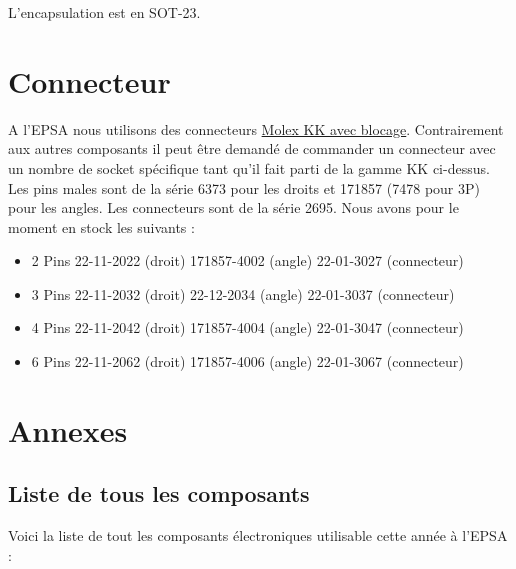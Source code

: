 \documentclass{EPSA-rap-template}
\begin{document}
L'encapsulation est en SOT-23.

\section{Connecteur}

A l'EPSA nous utilisons des connecteurs \href{https://www.mouser.fr/c/connectors/headers-wire-housings/?contact\%20gender=Pin\%20\%28Male\%29&contact\%20plating=Gold&m=Molex&mating\%20post\%20length=7.49\%20mm&mounting\%20angle=Straight&number\%20of\%20rows=1\%20Row&pitch=2.54\%20mm&termination\%20post\%20length=3.56\%20mm&type=Locking}{Molex KK avec blocage}. Contrairement aux autres composants il peut être demandé de commander un connecteur avec un nombre de socket spécifique tant qu'il fait parti de la gamme KK ci-dessus. Les pins males sont de la série 6373 pour les droits et 171857 (7478 pour 3P) pour les angles. Les connecteurs sont de la série 2695.  Nous avons pour le moment en stock les suivants :



\begin{itemize}
\item 2 Pins 22-11-2022 (droit) 171857-4002 (angle) 22-01-3027 (connecteur)
\item 3 Pins 22-11-2032 (droit) 22-12-2034 (angle) 22-01-3037 (connecteur)
\item 4 Pins 22-11-2042 (droit) 171857-4004 (angle) 22-01-3047 (connecteur)
\item 6 Pins 22-11-2062 (droit) 171857-4006 (angle) 22-01-3067 (connecteur)
\end{itemize}

\section{Annexes}

\subsection{Liste de tous les composants}

Voici la liste de tout les composants électroniques utilisable cette année à l'EPSA :
\end{document}
